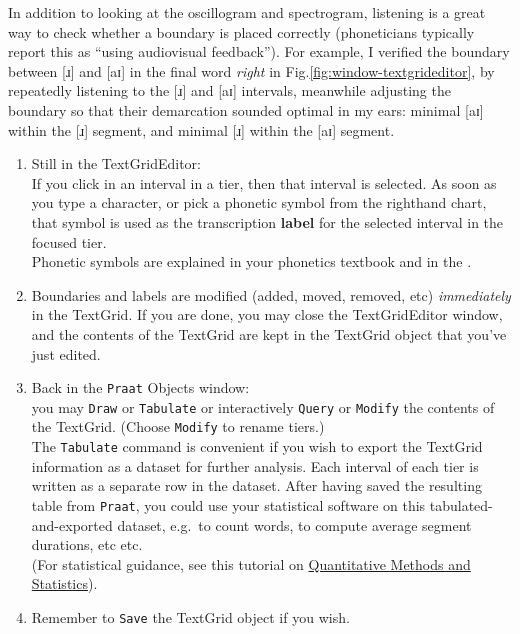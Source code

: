 \documentclass[
]{book}
\begin{document}
\begin{enumerate}
  In addition to looking at the oscillogram and spectrogram, listening is a great way to check whether a boundary is placed correctly (phoneticians typically report this as ``using audiovisual feedback''). For example, I verified the boundary between {[}ɹ{]} and {[}aɪ{]} in the final word \emph{right} in Fig.\ref{fig:window-textgrideditor}, by repeatedly listening to the {[}ɹ{]} and {[}aɪ{]} intervals, meanwhile adjusting the boundary so that their demarcation sounded optimal in my ears: minimal {[}aɪ{]} within the {[}ɹ{]} segment, and minimal {[}ɹ{]} within the {[}aɪ{]} segment.
\end{enumerate}

\begin{enumerate}
\def\labelenumi{(\arabic{enumi})}
\setcounter{enumi}{5}
\item
  Still in the TextGridEditor:\\
  If you click in an interval in a tier, then that interval is selected. As soon as you type a character, or pick a phonetic symbol from the righthand chart, that symbol is used as the transcription \textbf{label} for the selected interval in the focused tier.\\
  Phonetic symbols are explained in your phonetics textbook and in the \citet{HandbookIPA_1999}.
\item
  Boundaries and labels are modified (added, moved, removed, etc) \emph{immediately} in the TextGrid. If you are done, you may close the TextGridEditor window, and the contents of the TextGrid are kept in the TextGrid object that you've just edited.
\item
  Back in the \texttt{Praat} Objects window:\\
  you may \texttt{Draw} or \texttt{Tabulate} or interactively \texttt{Query} or \texttt{Modify} the contents of the TextGrid. (Choose \texttt{Modify} to rename tiers.)\\
  The \texttt{Tabulate} command is convenient if you wish to export the TextGrid information as a dataset for further analysis. Each interval of each tier is written as a separate row in the dataset. After having saved the resulting table from \texttt{Praat}, you could use your statistical software on this tabulated-and-exported dataset, e.g.~to count words, to compute average segment durations, etc etc.\\
  (For statistical guidance, see this tutorial on \href{https://hugoquene.github.io/QMS-EN/}{Quantitative Methods and Statistics}).
\item
  Remember to \texttt{Save} the TextGrid object if you wish.
\end{enumerate}
\end{document}
